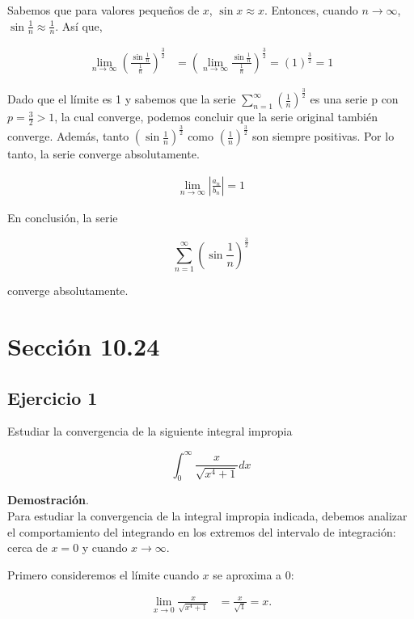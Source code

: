 \documentclass{article}
\begin{document}
    Sabemos que para valores pequeños de \(x\), \(\sin x \approx x\). Entonces, cuando \(n \to \infty\), \(\sin \frac{1}{n} \approx \frac{1}{n}\). Así que,

    \begin{align*}
    \lim _{n \rightarrow \infty}\left(\frac{\sin \frac{1}{n}}{\frac{1}{n}}\right)^{\frac{3}{2}} &= \left(\lim _{n \rightarrow \infty} \frac{\sin \frac{1}{n}}{\frac{1}{n}}\right)^{\frac{3}{2}} = (1)^{\frac{3}{2}} = 1
    \end{align*}

    Dado que el límite es 1 y sabemos que la serie \( \sum_{n=1}^{\infty} \left( \frac{1}{n} \right)^{\frac{3}{2}} \) es una serie p con \(p = \frac{3}{2} > 1\), la cual converge, podemos concluir que la serie original también converge. Además, tanto \(\left(\sin \frac{1}{n}\right)^{\frac{3}{2}}\) como \(\left(\frac{1}{n}\right)^{\frac{3}{2}}\) son siempre positivas. Por lo tanto, la serie converge absolutamente.

    \begin{align*}
    \lim _{n \rightarrow \infty}\left|\frac{a_n}{b_n}\right| = 1
    \end{align*}

    En conclusión, la serie

    $$
    \sum_{n=1}^{\infty}\left(\sin \frac{1}{n}\right)^{\frac{3}{2}}
    $$

    converge absolutamente.
    \section*{Sección 10.24}
    \subsection*{Ejercicio 1}

    Estudiar la convergencia de la siguiente integral impropia

    $$
    \int_{0}^{\infty} \frac{x}{\sqrt{x^{4}+1}} d x
    $$

    \textbf{Demostración}.\\

    Para estudiar la convergencia de la integral impropia indicada, debemos analizar el comportamiento del integrando en los extremos del intervalo de integración: cerca de $x = 0$ y cuando $x \to \infty$.

    Primero consideremos el límite cuando $x$ se aproxima a $0$:

    \begin{align*}
    \lim_{x \to 0} \frac{x}{\sqrt{x^4 + 1}}
    &= \frac{x}{\sqrt{1}} = x.
    \end{align*}
\end{document}
